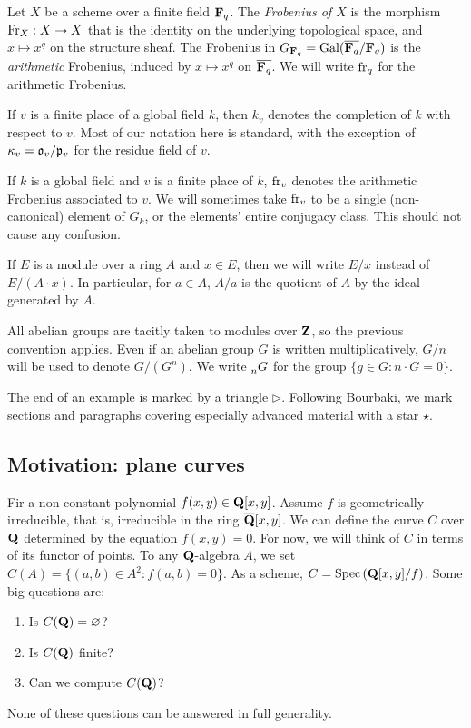 Let $X$ be a scheme over a finite field $\mathbf{F}_q$. The \emph{Frobenius of $X$} 
is the morphism $\mathrm{Fr}_X:X\to X$ that is the identity on the underlying 
topological space, and $x\mapsto x^q$ on the structure sheaf. The Frobenius in 
$G_{\mathbf{F}_q} = \operatorname{Gal}(\overline{\mathbf{F}_q}/\mathbf{F}_q)$ is the \emph{arithmetic} Frobenius, 
induced by $x\mapsto x^q$ on $\overline{\mathbf{F}_q}$. We will write $\mathrm{fr}_q$ for 
the arithmetic Frobenius. 

If $v$ is a finite place of a global field $k$, then $k_v$ denotes the 
completion of $k$ with respect to $v$. Most of our notation here is standard, 
with the exception of $\kappa_v=\mathfrak{o}_v/\mathfrak{p}_v$ for the residue field of $v$. 

If $k$ is a global field and $v$ is a finite place of $k$, $\mathrm{fr}_v$ denotes the 
arithmetic Frobenius associated to $v$. We will sometimes take $\mathrm{fr}_v$ to be 
a single (non-canonical) element of $G_k$, or the elements' entire conjugacy 
class. This should not cause any confusion. 

If $E$ is a module over a ring $A$ and $x\in E$, then we will write $E/x$ 
instead of $E/(A\cdot x)$. In particular, for $a\in A$, $A/a$ is the quotient 
of $A$ by the ideal generated by $A$. 

All abelian groups are tacitly taken to modules over $\mathbf{Z}$, so the previous 
convention applies. Even if an abelian group $G$ is written multiplicatively, 
$G/n$ will be used to denote $G/(G^n)$. We write $\prescript{}{n}{G}$ for the 
group $\{g\in G:n\cdot G=0\}$. 

The end of an example is marked by a triangle $\triangleright$. Following 
Bourbaki, we mark sections and paragraphs covering especially advanced 
material with a star $\star$. 










\subsection{Motivation: plane curves}



Fir a non-constant polynomial $f(x,y)\in\mathbf{Q}[x,y]$. Assume $f$ is 
geometrically irreducible, that is, irreducible in the ring 
$\overline{\mathbf{Q}}[x,y]$. We can define the curve $C$ over $\mathbf{Q}$ determined by the 
equation $f(x,y)=0$. For now, we will think of $C$ in terms of its functor of 
points. To any $\mathbf{Q}$-algebra $A$, we set $C(A)=\{(a,b)\in A^2:f(a,b)=0\}$. 
As a scheme, $C=\operatorname{Spec}\left(\mathbf{Q}[x,y]/f\right)$. Some big questions are:
\begin{enumerate}
  \item Is $C(\mathbf{Q})=\varnothing$?
  \item Is $C(\mathbf{Q})$ finite?
  \item Can we compute $C(\mathbf{Q})$?
\end{enumerate}
None of these questions can be answered in full generality. 

